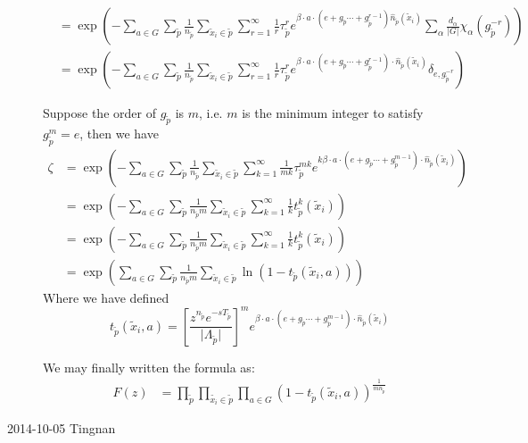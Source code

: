 \begin{description}
\begin{align*}
 & =\exp\left(-\sum_{a\in G}\sum_{\tilde{p}}\frac{1}{n_{\tilde{p}}}\sum_{\tilde{x}_{i}\in\tilde{p}}\sum_{r=1}^{\infty}\frac{1}{r}\tau_{\tilde{p}}^{r}e^{\beta\cdot a\cdot(e+g_{\tilde{p}}\cdots+g_{\tilde{p}}^{r-1})\hat{n}_{\tilde{p}}(\tilde{x}_{i})}\sum_{\alpha}\frac{d_{\alpha}}{\vert G\vert}\chi_{\alpha}(g_{\tilde{p}}^{-r})\right)\\
 & =\exp\left(-\sum_{a\in G}\sum_{\tilde{p}}\frac{1}{n_{\tilde{p}}}\sum_{\tilde{x}_{i}\in\tilde{p}}\sum_{r=1}^{\infty}\frac{1}{r}\tau_{\tilde{p}}^{r}e^{\beta\cdot a\cdot(e+g_{\tilde{p}}\cdots+g_{\tilde{p}}^{r-1})\cdot\hat{n}_{\tilde{p}}(\tilde{x}_{i})}\delta_{e,g_{\tilde{p}}^{-r}}\right)
\end{align*}


Suppose the order of $g_{\tilde{p}}$ is $m$, i.e. $m$ is the minimum
integer to satisfy $g_{\tilde{p}}^{m}=e$, then we have
\begin{align*}
\zeta & =\exp\left(-\sum_{a\in G}\sum_{\tilde{p}}\frac{1}{n_{\tilde{p}}}\sum_{\tilde{x}_{i}\in\tilde{p}}\sum_{k=1}^{\infty}\frac{1}{mk}\tau_{\tilde{p}}^{mk}e^{k\beta\cdot a\cdot(e+g_{\tilde{p}}\cdots+g_{\tilde{p}}^{m-1})\cdot\hat{n}_{\tilde{p}}(\tilde{x}_{i})}\right)\\
 & =\exp\left(-\sum_{a\in G}\sum_{\tilde{p}}\frac{1}{n_{\tilde{p}}m}\sum_{\tilde{x}_{i}\in\tilde{p}}\sum_{k=1}^{\infty}\frac{1}{k}t_{\tilde{p}}^{k}(\tilde{x}_{i})\right)\\
 & =\exp\left(-\sum_{a\in G}\sum_{\tilde{p}}\frac{1}{n_{\tilde{p}}m}\sum_{\tilde{x}_{i}\in\tilde{p}}\sum_{k=1}^{\infty}\frac{1}{k}t_{\tilde{p}}^{k}(\tilde{x}_{i})\right)\\
 & =\exp\left(\sum_{a\in G}\sum_{\tilde{p}}\frac{1}{n_{\tilde{p}}m}\sum_{\tilde{x}_{i}\in\tilde{p}}\ln\left(1-t_{\tilde{p}}(\tilde{x}_{i},a)\right)\right)
\end{align*}
Where we have defined 
\[
t_{\tilde{p}}(\tilde{x}_{i},a)=\left[\frac{z^{n_{\tilde{p}}}e^{-sT_{\tilde{p}}}}{\vert\Lambda_{\tilde{p}}\vert}\right]^{m}e^{\beta\cdot a\cdot(e+g_{\tilde{p}}\cdots+g_{\tilde{p}}^{m-1})\cdot\hat{n}_{\tilde{p}}(\tilde{x}_{i})}
\]


We may finally written the formula as:
\begin{align*}
F(z) & =\prod_{\tilde{p}}\prod_{\tilde{x_{i}}\in\tilde{p}}\prod_{a\in G}\left(1-t_{\tilde{p}}(\tilde{x}_{i},a)\right)^{\frac{1}{mn_{\tilde{p}}}}
\end{align*}


\item[2014-10-05 Tingnan]



\end{description}

